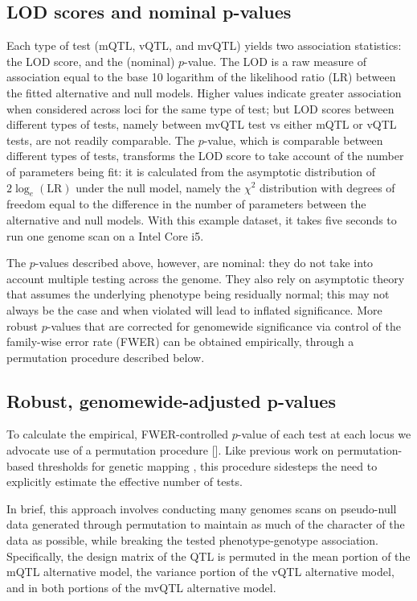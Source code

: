 \documentclass[9pt,twocolumn,twoside]{gsag3jnl}
\begin{document}
\subsection{LOD scores and nominal p-values}

Each type of test (mQTL, vQTL, and mvQTL) yields two association statistics: the LOD score, and the (nominal) $p$-value. The LOD is a raw measure of association equal to the base 10 logarithm of the likelihood ratio (LR) between the fitted alternative and null models. Higher values indicate greater association when considered across loci for the same type of test; but LOD scores between different types of tests, namely between mvQTL test vs either mQTL or vQTL tests, are not readily comparable. The $p$-value, which is comparable between different types of tests, transforms the LOD score to take account of the number of parameters being fit: it is calculated from the asymptotic distribution of $2\log_e\left(\text{LR}\right)$ under the null model, namely the $\chi^2$ distribution with degrees of freedom equal to the difference in the number of parameters between the alternative and null models. With this example dataset, it takes five seconds to run one genome scan on a Intel Core i5.

The $p$-values described above, however, are nominal: they do not take into account multiple testing across the genome. They also rely on asymptotic theory that assumes the underlying phenotype being residually normal; this may not always be the case and when violated will lead to inflated significance. More robust $p$-values that are corrected for genomewide significance via control of the family-wise error rate (FWER) can be obtained empirically, through a permutation procedure described below.

\subsection{Robust, genomewide-adjusted p-values}

To calculate the empirical, FWER-controlled $p$-value of each test at each locus we advocate use of a permutation procedure [\CortyMethodsPaper].
Like previous work on permutation-based thresholds for genetic mapping \citep{Churchill1994,Carlborg2002}, this procedure sidesteps the need to explicitly estimate the effective number of tests.

In brief, this approach involves conducting many genomes scans on pseudo-null data generated through permutation to maintain as much of the character of the data as possible, while breaking the tested phenotype-genotype association.
Specifically, the design matrix of the QTL is permuted in the mean portion of the mQTL alternative model, the variance portion of the vQTL alternative model, and in both portions of the mvQTL alternative model.
\end{document}
